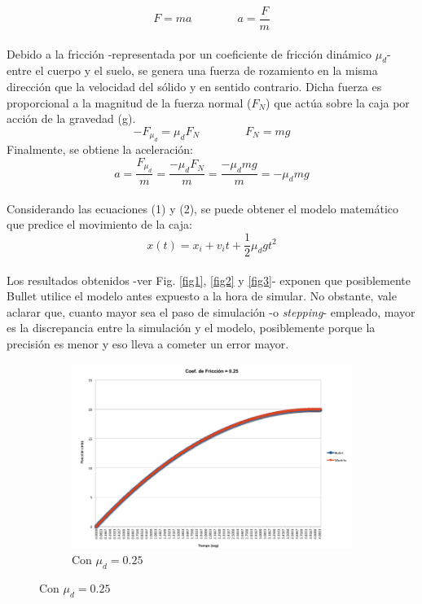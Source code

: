 \documentclass{article}
\begin{document}
\begin{itemize}
\[
  F = ma \qquad\text{}\qquad a=\frac{F}{m}
\]
\\Debido a la fricci\'on -representada por un coeficiente de fricci\'on din\'amico $\mu_d$-  entre el cuerpo y el suelo, se genera una fuerza de rozamiento en la misma direcci\'on que la velocidad del s\'olido y en sentido contrario. Dicha fuerza es proporcional a la magnitud de la fuerza normal ($F_N$) que act\'ua sobre la caja por acci\'on de la gravedad (g).
\[
  -F_{\mu_d} = \mu_d F_N \qquad\text{}\qquad F_N=mg
\]
Finalmente, se obtiene la aceleraci\'on:\\
 \begin{equation}
  a = \frac{F_{\mu_d}}{m}= \frac{-\mu_dF_N}{m} = \frac{-\mu_d mg}{m} = -\mu_dmg
\end{equation}
\\Considerando las ecuaciones (1) y (2), se puede obtener el modelo matem\'atico que predice el movimiento de la caja:\\
 \begin{equation}
  x(t) = x_i +v_i t+\frac{1}{2} \mu_d gt^2
\end{equation}
\\Los resultados obtenidos -ver Fig. \ref{fig1}, \ref{fig2} y \ref{fig3}- exponen que posiblemente Bullet utilice el modelo antes expuesto a la hora de simular. No obstante, vale aclarar que, cuanto mayor sea el paso de simulaci\'on  -o \textit{stepping}- empleado, mayor es la discrepancia entre la simulaci\'on y el modelo, posiblemente porque la precisi\'on es menor y eso lleva a cometer un error mayor. \\ 
\begin{figure}[ht] 
  \begin{subfigure}[b]{0.5\linewidth}
    \centering
    \includegraphics[width=0.75\linewidth]{image002.png} 
    \caption{Con $\mu_d=0.25$} 
    \label{fig1:a} 
    \vspace{4ex}
  \end{subfigure}%

\end{figure}
\end{itemize}
\end{document}
